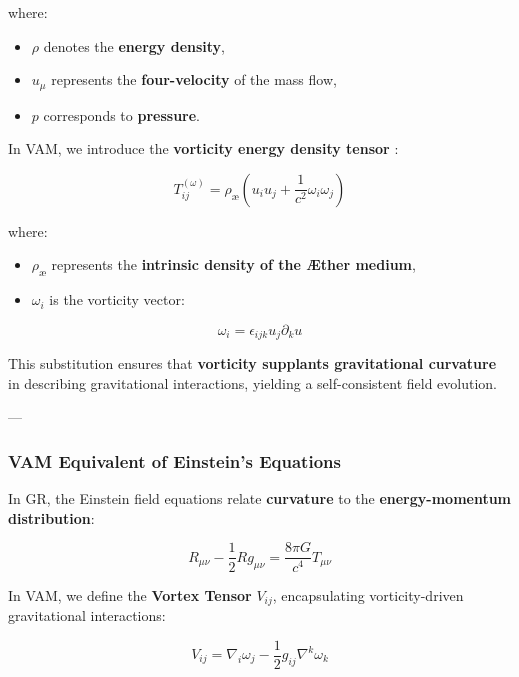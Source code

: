 where:
\begin{itemize}
    \item $\rho$ denotes the \textbf{energy density},
    \item $u_\mu$ represents the \textbf{four-velocity} of the mass flow,
    \item $p$ corresponds to \textbf{pressure}.
\end{itemize}

In VAM, we introduce the \textbf{vorticity energy density tensor} \cite{thomson_vortex}:



\begin{equation*}
    T^{(\omega)}_{ij} = \rho_\text{\ae} \left( u_i u_j + \frac{1}{c^2} \omega_i \omega_j \right)
\end{equation*}


where:
\begin{itemize}
    \item $\rho_\text{\ae}$ represents the \textbf{intrinsic density of the Æther medium},
    \item $\omega_i$ is the vorticity vector:
\end{itemize}


\begin{equation*}
    \omega_i = \epsilon_{ijk} u_j \partial_k u
\end{equation*}

This substitution ensures that \textbf{vorticity supplants gravitational curvature} in describing gravitational interactions, yielding a self-consistent field evolution.



---

\subsubsection*{VAM Equivalent of Einstein's Equations}
In GR, the Einstein field equations relate \textbf{curvature} to the \textbf{energy-momentum distribution}:

\begin{equation*}
    R_{\mu\nu} - \frac{1}{2} R g_{\mu\nu} = \frac{8\pi G}{c^4} T_{\mu\nu}
\end{equation*}


In VAM, we define the \textbf{Vortex Tensor} $V_{ij}$, encapsulating vorticity-driven gravitational interactions:

\begin{equation*}
    V_{ij} = \nabla_i \omega_j - \frac{1}{2} g_{ij} \nabla^k \omega_k
\end{equation*}



